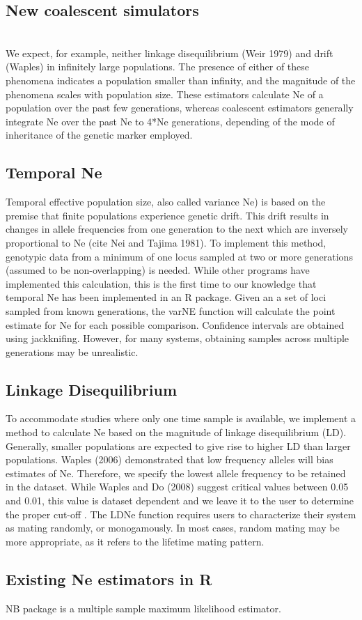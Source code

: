 \documentclass[english,titlepage]{article}
\begin{document}
\subsection{New coalescent simulators}
\citep{Palacios2013}
\\

We expect, for example, neither linkage disequilibrium (Weir 1979) and drift (Waples) in infinitely large populations. The presence of either of these phenomena indicates a population smaller than infinity, and the magnitude of the phenomena scales with population size. These estimators calculate Ne of a population over the past few generations, whereas coalescent estimators generally integrate Ne over the past Ne to 4*Ne generations, depending of the mode of inheritance of the genetic marker employed.

\subsection*{Temporal Ne}

Temporal effective population size, also called variance Ne) is based on the premise that finite populations experience genetic drift. This drift results in changes in allele frequencies from one generation to the next which are inversely proportional to Ne (cite Nei and Tajima 1981). To implement this method, genotypic data from a minimum of one locus sampled at two or more generations (assumed to be non-overlapping) is needed. While other programs have implemented this calculation, this is the first time to our knowledge that temporal Ne has been implemented in an R package. Given an a set of loci sampled from known generations, the varNE function will calculate the point estimate for Ne for each possible comparison. Confidence intervals are obtained using jackknifing. However, for many systems, obtaining samples across multiple generations may be unrealistic.

\subsection*{Linkage Disequilibrium}

To accommodate studies where only one time sample is available, we implement a method to calculate Ne based on the magnitude of linkage disequilibrium (LD). Generally, smaller populations are expected to give rise to higher LD than larger populations. 
Waples (2006) demonstrated that low frequency alleles will bias estimates of Ne. Therefore, we specify the lowest allele frequency to be retained in the dataset.  While Waples and Do (2008) suggest critical values between 0.05 and 0.01, this value is dataset dependent and we leave it to the user to determine the proper cut-off \citep{Waples2010,Waples2008}. The LDNe function requires users to characterize their system as mating randomly, or monogamously. In most cases, random mating may be more appropriate, as it refers to the lifetime mating pattern. 

\subsection{Existing Ne estimators in R}
NB package is a multiple sample maximum likelihood estimator.
  


\end{document}

